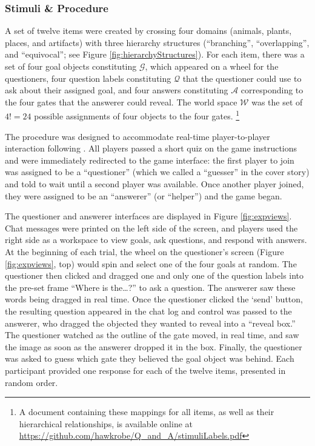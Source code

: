 \documentclass[12pt, floatsintext, jou]{apa6}
\begin{document}
\subsubsection{Stimuli \& Procedure} A set of twelve items were created by crossing four domains (animals, plants, places, and artifacts) with three hierarchy structures (``branching'', ``overlapping'', and ``equivocal''; see Figure \ref{fig:hierarchyStructures}). For each item, there was a set of four goal objects constituting $\mathcal{G}$, which appeared on a wheel for the questioners, four question labels constituting $\mathcal{Q}$ that the questioner could use to ask about their assigned goal, and four answers constituting $\mathcal{A}$ corresponding to the four gates that the answerer could reveal. The world space $\mathcal{W}$ was the set of $4! = 24$ possible assignments of four objects to the four gates. \footnote{A document containing these mappings for all items, as well as their hierarchical relationships, is available online at \scriptsize	\url{https://github.com/hawkrobe/Q\_and\_A/stimuliLabels.pdf} } 

The procedure was designed to accommodate real-time player-to-player interaction following . All players passed a short quiz on the game instructions and were immediately redirected to the game interface: the first player to join was assigned to be a ``questioner'' (which we called a ``guesser'' in the cover story) and told to wait until a second player was available. Once another player joined, they were assigned to be an ``answerer'' (or ``helper'') and the game began. 

The questioner and answerer interfaces are displayed in Figure \ref{fig:expviews}. Chat messages were printed on the left side of the screen, and players used the right side as a workspace to view goals, ask questions, and respond with answers. At the beginning of each trial, the wheel on the questioner's screen (Figure \ref{fig:expviews}, top) would spin and select one of the four goals at random. The questioner then clicked and dragged one and only one of the question labels into the pre-set frame ``Where is the\dots?'' to ask a question. The answerer saw these words being dragged in real time. Once the questioner clicked the `send' button, the resulting question appeared in the chat log and control was passed to the answerer, who dragged the objected they wanted to reveal into a ``reveal box.'' The questioner watched as the outline of the gate moved, in real time, and saw the image as soon as the answerer dropped it in the box. Finally, the questioner was asked to guess which gate they believed the goal object was behind. Each participant provided one response for each of the twelve items, presented in random order. 
\end{document}
